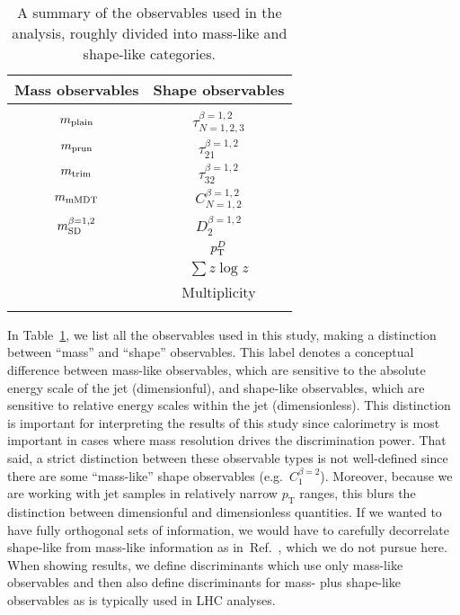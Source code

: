 \documentclass[11pt,letterpaper]{article}
\DeclareRobustCommand{\Tab}[1]{Table~\ref{#1}}
\DeclareRobustCommand{\Ref}[1]{Ref.~\cite{#1}}
\newcommand{\pt}{p_{\mathrm{T}}}
\begin{document}
\begin{table}[t]
\centering
\begin{tabular}{|c|c|}	\hline
	\textbf{Mass observables} & \textbf{Shape observables} \\\hline\hline \hfill & \hfill\\
	$m_{\rm plain}$							&	$\tau_{N = 1,2,3}^{\beta=1,2}$			\\
	        $m_{\rm prun}$         			&		  $\tau_{21}^{\beta=1,2}$	\\
			$m_{\rm trim}$					&      $\tau_{32}^{\beta=1,2}$	\\
	 	$m_{\rm mMDT}$  & 	$C_{N =1,2}^{\beta=1,2}$		\\
	 	$m_{\rm SD}^{\beta=1,2}$		& $D_2^{\beta=1,2}$				\\
  								&	$p_{\rm T}^D$				\\
								&	$\sum z \log z$					\\
			&	Multiplicity				\\ \hfill & \hfill \\

\hline
\end{tabular}
\caption{A summary of the observables used in the analysis, roughly divided into mass-like and shape-like categories.}
\label{tab:obslist}
\end{table}


In \Tab{tab:obslist}, we list all the observables used in this study, making a distinction between ``mass'' and ``shape'' observables. 
%
This label denotes a conceptual difference between mass-like observables, which are sensitive to the absolute energy scale of the jet (dimensionful), and shape-like observables, which are sensitive to relative energy scales within the jet (dimensionless).
%
This distinction is important for interpreting the results of this study since calorimetry is most important in cases where mass resolution drives the discrimination power.
%
That said, a strict distinction between these observable types is not well-defined since there are some ``mass-like'' shape observables (e.g.~$C_1^{\beta = 2}$).
%
Moreover, because we are working with jet samples in relatively narrow $\pt$ ranges, this blurs the distinction between dimensionful and dimensionless quantities.
%
If we wanted to have fully orthogonal sets of information, we would have to carefully decorrelate shape-like from mass-like information as in~\Ref{Dolen:2016kst,Shimmin:2017mfk}, which we do not pursue here.
%
When showing results, we define discriminants which use only mass-like observables and then also define discriminants for mass- plus shape-like observables as is typically used in LHC analyses. 
\end{document}
